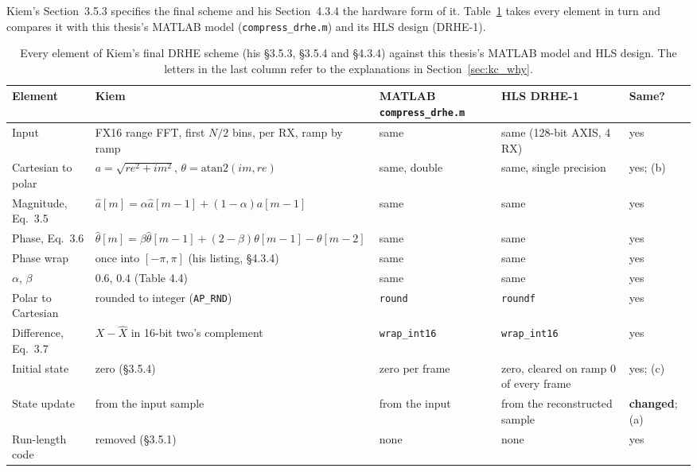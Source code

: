 Kiem's Section~3.5.3 specifies the final scheme and his Section~4.3.4 the
hardware form of it. Table~\ref{tab:kc_audit} takes every element in turn and
compares it with this thesis's MATLAB model (\texttt{compress\_drhe.m}) and its
HLS design (DRHE-1).

\begin{table}[p]
\centering
\caption[DRHE audit against Kiem \S{}3.5.3]{Every element of Kiem's final DRHE
scheme (his \S{}3.5.3, \S{}3.5.4 and \S{}4.3.4) against this thesis's MATLAB model and
HLS design. The letters in the last column refer to the explanations in
Section~\ref{sec:kc_why}.}
\label{tab:kc_audit}
\scriptsize
\renewcommand{\arraystretch}{1.25}
\setlength{\tabcolsep}{3pt}
\begin{tabular}{@{}>{\raggedright}p{}>{\raggedright}p{}>{\raggedright}p{}>{\raggedright}p{}>{\raggedright\arraybackslash}p{}@{}}
\toprule
Element & Kiem & MATLAB \texttt{compress\_drhe.m} & HLS DRHE-1 & Same?\\
\midrule
Input & FX16 range FFT, first $N/2$ bins, per RX, ramp by ramp & same & same (128-bit AXIS, 4 RX) & yes\\
Cartesian to polar & $a = \sqrt{re^2+im^2}$, $\theta = \mathrm{atan2}(im, re)$ & same, double & same, single precision & yes; (b)\\
Magnitude, Eq.~3.5 & $\hat a[m] = \alpha\hat a[m-1] + (1-\alpha)a[m-1]$ & same & same & yes\\
Phase, Eq.~3.6 & $\hat\theta[m] = \beta\hat\theta[m-1] + (2-\beta)\theta[m-1] - \theta[m-2]$ & same & same & yes\\
Phase wrap & once into $[-\pi,\pi]$ (his listing, \S{}4.3.4) & same & same & yes\\
$\alpha$, $\beta$ & 0.6, 0.4 (Table 4.4) & same & same & yes\\
Polar to Cartesian & rounded to integer (\texttt{AP\_RND}) & \texttt{round} & \texttt{roundf} & yes\\
Difference, Eq.~3.7 & $X - \hat X$ in 16-bit two's complement & \texttt{wrap\_int16} & \texttt{wrap\_int16} & yes\\
Initial state & zero (\S{}3.5.4) & zero per frame & zero, cleared on ramp 0 of every frame & yes; (c)\\
State update & from the input sample & from the input & from the reconstructed sample & \textbf{changed}; (a)\\
Run-length code & removed (\S{}3.5.1) & none & none & yes\\

\end{tabular}
\end{table}
